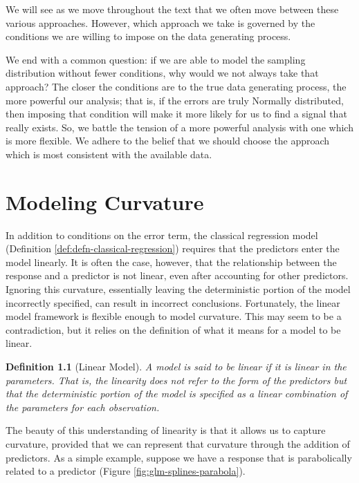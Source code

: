 \documentclass[
]{book}
\theoremstyle{plain}
\theoremstyle{mydefn}
\newtheorem{definition}{Definition}[chapter]
\theoremstyle{myexmpl}
\theoremstyle{remark}
\begin{document}
We will see as we move throughout the text that we often move between these various approaches. However, which approach we take is governed by the conditions we are willing to impose on the data generating process.

We end with a common question: if we are able to model the sampling distribution without fewer conditions, why would we not always take that approach? The closer the conditions are to the true data generating process, the more powerful our analysis; that is, if the errors are truly Normally distributed, then imposing that condition will make it more likely for us to find a signal that really exists. So, we battle the tension of a more powerful analysis with one which is more flexible. We adhere to the belief that we should choose the approach which is most consistent with the available data.

\hypertarget{glm-splines}{%
\chapter{Modeling Curvature}\label{glm-splines}}

In addition to conditions on the error term, the classical regression model (Definition \ref{def:defn-classical-regression}) requires that the predictors enter the model linearly. It is often the case, however, that the relationship between the response and a predictor is not linear, even after accounting for other predictors. Ignoring this curvature, essentially leaving the deterministic portion of the model incorrectly specified, can result in incorrect conclusions. Fortunately, the linear model framework is flexible enough to model curvature. This may seem to be a contradiction, but it relies on the definition of what it means for a model to be linear.

\begin{definition}[Linear Model]
A model is said to be linear if it is linear in the \emph{parameters}. That is, the linearity does not refer to the form of the predictors but that the deterministic portion of the model is specified as a linear combination of the parameters for each observation.
\end{definition}

The beauty of this understanding of linearity is that it allows us to capture curvature, provided that we can represent that curvature through the addition of predictors. As a simple example, suppose we have a response that is parabolically related to a predictor (Figure \ref{fig:glm-splines-parabola}).
\end{document}
